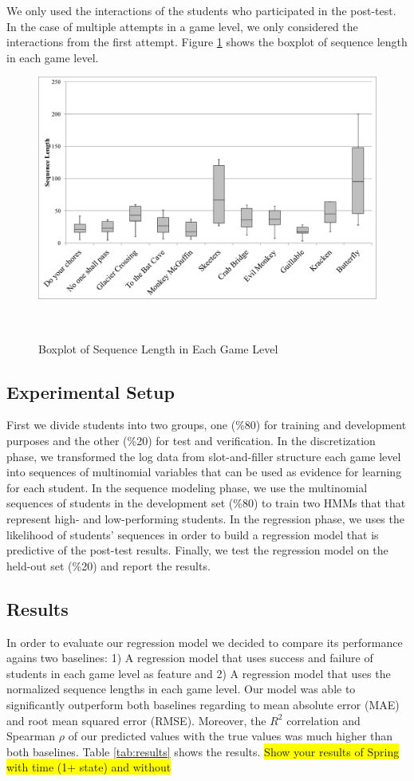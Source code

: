 \documentclass{sigchi}
\newcommand{\hl}[1]{\colorbox{yellow}{#1}}
\begin{document}
We only used the interactions of the students who participated in the post-test.
In the case of multiple attempts in a game level, we only considered the interactions from the first attempt.
Figure \ref{fig:boxplot} shows the boxplot of sequence length in each game level. 

\begin{figure}
	\centering
	\includegraphics[width=0.9\columnwidth]{figures/boxplot}
	\caption{Boxplot of Sequence Length in Each Game Level}~\label{fig:boxplot}
\end{figure}

\subsection{Experimental Setup}
First we divide students into two groups, one (\%80) for training and development purposes and the other (\%20) for test and verification.
In the discretization phase, we transformed the log data from slot-and-filler structure each game level into sequences of multinomial variables that can be used as evidence for learning for each student.
In the sequence modeling phase, we use the multinomial sequences of students in the development set (\%80) to train two HMMs that that represent high- and low-performing students.
In the regression phase, we uses the likelihood of students' sequences in order to build a regression model that is predictive of the post-test results.
Finally, we test the regression model on the held-out set (\%20) and report the results.


\subsection{Results}
In order to evaluate our regression model we decided to compare its performance agains two baselines: 1) A regression model that uses success and failure of students in each game level as feature and 2) A regression model that uses the normalized sequence lengths in each game level. 
Our model was able to significantly outperform both baselines regarding to mean absolute error (MAE) and root mean squared error (RMSE). 
Moreover, the $R^2$ correlation and Spearman $\rho$ of our predicted values with the true values was much higher than both baselines. 
Table \ref{tab:results} shows the results. 
\hl{Show your results of Spring with time (1+ state) and without}
\end{document}

